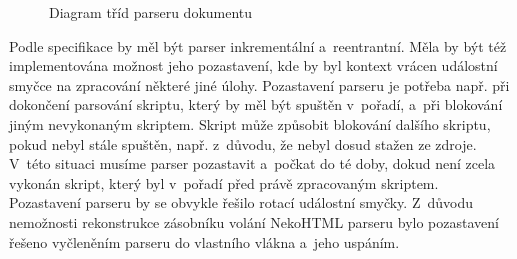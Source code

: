 \begin{figure}[H]
  \begin{center}
    \caption{Diagram tříd parseru dokumentu}
    \label{Figure.DocumentParser}
  \end{center}
\end{figure}

Podle specifikace by měl být parser inkrementální a~reentrantní. Měla by být též implementována možnost jeho pozastavení, kde by byl kontext vrácen událostní smyčce na zpracování některé jiné úlohy. Pozastavení parseru je potřeba např. při dokončení parsování skriptu, který by měl být spuštěn v~pořadí, a~při blokování jiným nevykonaným skriptem. Skript může způsobit blokování dalšího skriptu, pokud nebyl stále spuštěn, např. z~důvodu, že nebyl dosud stažen ze zdroje. V~této situaci musíme parser pozastavit a~počkat do té doby, dokud není zcela vykonán skript, který byl v~pořadí před právě zpracovaným skriptem. Pozastavení parseru by se obvykle řešilo rotací událostní smyčky. Z~důvodu nemožnosti rekonstrukce zásobníku volání NekoHTML parseru bylo pozastavení řešeno vyčleněním parseru do vlastního vlákna a~jeho uspáním.


